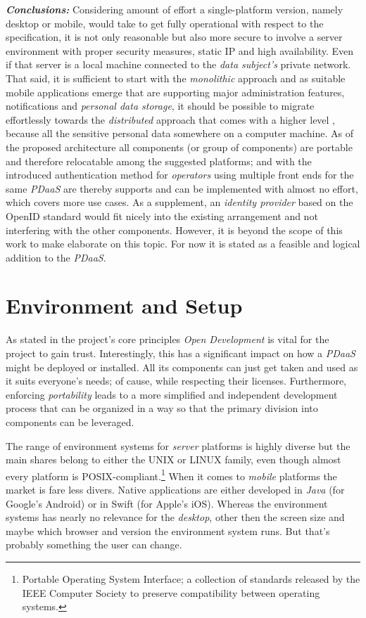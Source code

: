 \documentclass[12pt,english,a4paper,titlepage,cleardoublepage=empty,dottedtoc]{report}
\begin{document}
\emph{\textbf{Conclusions:}} Considering amount of effort a
single-platform version, namely desktop or mobile, would take to get
fully operational with respect to the specification, it is not only
reasonable but also more secure to involve a server environment with
proper security measures, static IP and high availability. Even if that
server is a local machine connected to the \emph{data subject's} private
network. That said, it is sufficient to start with the \emph{monolithic}
approach and as suitable mobile applications emerge that are supporting
major administration features, notifications and \emph{personal data
storage}, it should be possible to migrate effortlessly towards the
\emph{distributed} approach that comes with a higher level , because all
the sensitive personal data somewhere on a computer machine. As of the
proposed architecture all components (or group of components) are
portable and therefore relocatable among the suggested platforms; and
with the introduced authentication method for \emph{operators} using
multiple front ends for the same \emph{PDaaS} are thereby supports and
can be implemented with almost no effort, which covers more use cases.
As a supplement, an \emph{identity provider} based on the OpenID
standard would fit nicely into the existing arrangement and not
interfering with the other components. However, it is beyond the scope
of this work to make elaborate on this topic. For now it is stated as a
feasible and logical addition to the \emph{PDaaS}.

\section{Environment and Setup}\label{environment-and-setup}

As stated in the project's core principles \emph{Open Development} is
vital for the project to gain trust. Interestingly, this has a
significant impact on how a \emph{PDaaS} might be deployed or installed.
All its components can just get taken and used as it suits everyone's
needs; of cause, while respecting their licenses. Furthermore, enforcing
\emph{portability} leads to a more simplified and independent
development process that can be organized in a way so that the primary
division into components can be leveraged.

The range of environment systems for \emph{server} platforms is highly
diverse but the main shares belong to either the UNIX or LINUX family,
even though almost every platform is POSIX-compliant.\footnote{Portable
  Operating System Interface; a collection of standards released by the
  IEEE Computer Society to preserve compatibility between operating
  systems.} When it comes to \emph{mobile} platforms the market is fare
less divers. Native applications are either developed in \emph{Java}
(for Google's Android) or in Swift (for Apple's iOS). Whereas the
environment systems has nearly no relevance for the \emph{desktop},
other then the screen size and maybe which browser and version the
environment system runs. But that's probably something the user can
change.
\end{document}
